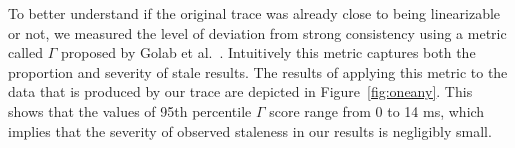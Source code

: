 \documentclass[journal,compsoc]{IEEEtran}
\begin{document}
To better understand if the original trace was already close to being linearizable or not, we measured the level of deviation from strong consistency using a metric called $\Gamma$ proposed by Golab et al.~\cite{DBLP:conf/cloud/GolabRAKWG13}. Intuitively this
metric captures both the proportion and severity of stale results. The results of applying this metric to the data that is produced by our trace are depicted in Figure~\ref{fig:oneany}. This shows that the values of 95th percentile 
$\Gamma$ score range from 0 to 14 ms, which implies that the severity of observed staleness in our results is negligibly small.
\end{document}
